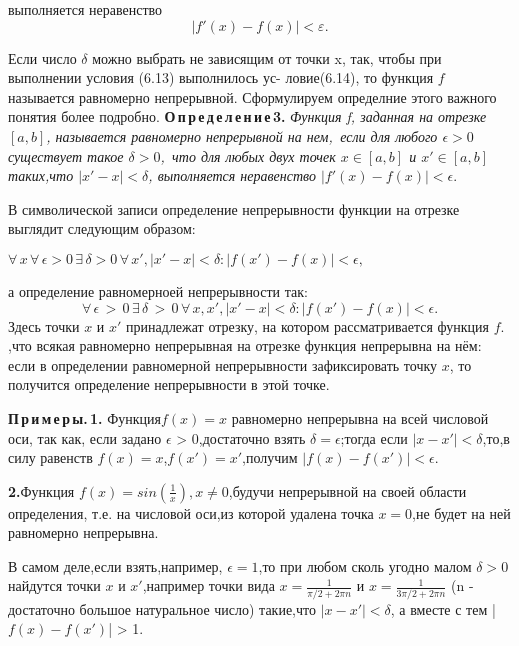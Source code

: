 \documentclass[a4paper,12pt]{article}
\begin{document}
    \large
    \noindent выполняется неравенство
    \begin{equation}
    |f'(x)-f(x)| < \varepsilon \text{.} \tag{6.14}
    \end{equation}
    \par Если число $\delta$ можно
    выбрать не зависящим от точки x, так, чтобы при выполнении условия (6.13) выполнилось ус- ловие(6.14), то функция $f$ называется равномерно непрерывной. Сформулируем определние этого важного понятия более подробно.
    \newline
    \noindent\textbf{О\,п\,р\,е\,д\,е\,л\,е\,н\,и\,е\,3.}
    \textsl{Функция f, заданная на отрезке $ [a, b] $, называется равномерно непрерывной на нем, \,если для любого  $ \epsilon > 0 $ существует такое $ \delta>0 $, \,что для любых двух точек $x \in [a, b]$ и $x' \in [a, b]$ таких,что $|x'-x| < \delta$, выполняется неравенство $|f'(x)-f(x)| < \epsilon.$}
    \vspace {0.3cm}
    \par В символической записи определение непрерывности функции на отрезке выглядит следующим образом:\vspace {0.3cm}
    \par 
    $\forall \,x\,\forall \,\epsilon > 0 \,\exists\,\delta > 0\, \forall \,x', |x' - x| < \delta:|f(x') - f(x)|<\epsilon,$\vspace {0.3cm}\par\noindent
    а определение равномерноей непрерывности так:
    \begin{equation}
        \forall\,\epsilon\,>\,0\,\exists\,\delta\,>\,0\,\forall\,x,x',|x'-x| < \delta:|f(x')- f(x)| < \epsilon.
        \tag{6.15} 
    \end{equation}
    \noindent Здесь точки $x$ и $x'$ принадлежат отрезку, на котором рассматривается функция $f$.
    ,что всякая равномерно непрерывная на отрезке функция непрерывна на нём: если в определении равномерной непрерывности зафиксировать точку $x$, то получится определение непрерывности в этой точке.
    \par \textbf{П\,р\,и\,м\,е\,р\,ы.\,1.} Функция$f(x) = x$ равномерно непрерывна на всей числовой оси, так как, если задано $\epsilon$ > 0,достаточно взять $\delta = \epsilon$;тогда если $|x - x'| < \delta$,то,в силу равенств $f(x) = x$,$f(x') = x'$,получим $|f(x) - f(x')| < \epsilon$.
    \par \textbf{2.}Функция $f(x) = sin(\frac{1}{x}),x \ne 0$,будучи непрерывной на своей области определения, т.е. на числовой оси,из которой удалена точка $x = 0$,не будет на ней равномерно непрерывна.
    \par В самом деле,если взять,например, $\epsilon = 1$,то при любом сколь угодно малом $\delta > 0$ найдутся точки $x$ и $x'$,например точки вида $x = \frac{1}{\pi/2 + 2\pi n}$ и $x = \frac{1}{3\pi/2 + 2\pi n}$ (n - достаточно большое натуральное число) такие,что $|x - x'| < \delta$, а вместе с тем |$f(x)-f(x')$| > 1.
\end{document}
